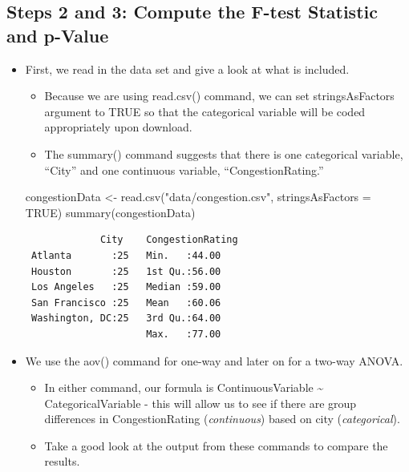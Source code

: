 \documentclass[
  letterpaper,
  DIV=11,
  numbers=noendperiod]{scrreprt}
\newenvironment{Shaded}{\begin{snugshade}}{\end{snugshade}}
\newcommand{\AttributeTok}[1]{\textcolor[rgb]{0.40,0.45,0.13}{#1}}
\newcommand{\ConstantTok}[1]{\textcolor[rgb]{0.56,0.35,0.01}{#1}}
\newcommand{\FunctionTok}[1]{\textcolor[rgb]{0.28,0.35,0.67}{#1}}
\newcommand{\NormalTok}[1]{\textcolor[rgb]{0.00,0.23,0.31}{#1}}
\newcommand{\OtherTok}[1]{\textcolor[rgb]{0.00,0.23,0.31}{#1}}
\newcommand{\StringTok}[1]{\textcolor[rgb]{0.13,0.47,0.30}{#1}}
\providecommand{\tightlist}{%
  \setlength{\itemsep}{0pt}\setlength{\parskip}{0pt}}\usepackage{longtable,booktabs,array}
\begin{document}
\subsection{Steps 2 and 3: Compute the F-test Statistic and
p-Value}\label{steps-2-and-3-compute-the-f-test-statistic-and-p-value}

\begin{itemize}
\item
  First, we read in the data set and give a look at what is included.

  \begin{itemize}
  \tightlist
  \item
    Because we are using read.csv() command, we can set stringsAsFactors
    argument to TRUE so that the categorical variable will be coded
    appropriately upon download.
  \item
    The summary() command suggests that there is one categorical
    variable, ``City'' and one continuous variable,
    ``CongestionRating.''
  \end{itemize}

\begin{Shaded}
\begin{Highlighting}[]
\NormalTok{congestionData }\OtherTok{\textless{}{-}} \FunctionTok{read.csv}\NormalTok{(}\StringTok{"data/congestion.csv"}\NormalTok{, }\AttributeTok{stringsAsFactors =} \ConstantTok{TRUE}\NormalTok{)}
\FunctionTok{summary}\NormalTok{(congestionData)}
\end{Highlighting}
\end{Shaded}

\begin{verbatim}
             City    CongestionRating
 Atlanta       :25   Min.   :44.00   
 Houston       :25   1st Qu.:56.00   
 Los Angeles   :25   Median :59.00   
 San Francisco :25   Mean   :60.06   
 Washington, DC:25   3rd Qu.:64.00   
                     Max.   :77.00   
\end{verbatim}
\item
  We use the aov() command for one-way and later on for a two-way ANOVA.

  \begin{itemize}
  \tightlist
  \item
    In either command, our formula is ContinuousVariable
    \textasciitilde{} CategoricalVariable - this will allow us to see if
    there are group differences in CongestionRating (\emph{continuous})
    based on city (\emph{categorical}).
  \item
    Take a good look at the output from these commands to compare the
    results.
  \end{itemize}
\end{itemize}
\end{document}

